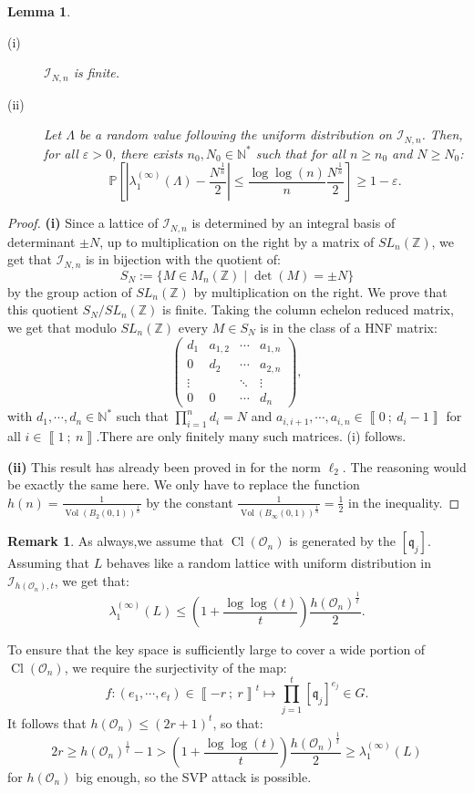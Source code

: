 \documentclass[a4paper,10pt]{report}
\theoremstyle{definition}
\theoremstyle{plain}
\newtheorem{Lemma}[Definition]{Lemma}
\theoremstyle{definition}
\newtheorem{Remark}[Definition]{Remark}
\newcommand{\N}{\mathbb{N}}
\newcommand{\Z}{\mathbb{Z}}
\newcommand{\m}[1]{\mathcal{#1}}
\newcommand{\mO}{\mathcal{O}}
\renewcommand{\i}[2]{\left\llbracket #1~;~#2\right\rrbracket}
\renewcommand{\(}{\left(}
\renewcommand{\)}{\right)}
\renewcommand{\P}{\mathbb{P}}
\newcommand{\mf}[1]{\mathfrak{#1}}
\DeclareMathOperator{\Cl}{Cl}
\DeclareMathOperator{\Vol}{Vol}
\begin{document}
\begin{Lemma}\label{Lemma 22}
\begin{description}
\item[(i)] $\m{I}_{N,n}$ is finite.
\item[(ii)] Let $\Lambda$ be a random value following the uniform distribution on $\m{I}_{N,n}$. Then, for all $\varepsilon>0$, there exists $n_0, N_0\in\N^*$ such that for all $n\geq n_0$ and $N\geq N_0$:
\[\P\left[\left|\lambda_1^{(\infty)}(\Lambda)-\frac{N^{\frac{1}{n}}}{2}\right|\leq \frac{\log\log(n)}{n}\frac{N^{\frac{1}{n}}}{2}\right]\geq 1-\varepsilon.\]
\end{description}
\end{Lemma}

\begin{proof}
\textbf{(i)} Since a lattice of $\m{I}_{N,n}$ is determined by an integral basis of determinant $\pm N$, up to multiplication on the right by a matrix of $SL_n(\Z)$, we get that $\m{I}_{N,n}$ is in bijection with the quotient of:
\[S_N:=\{M\in M_n(\Z)\mid \det(M)=\pm N\}\]
by the group action of $SL_n(\Z)$ by multiplication on the right.  We prove that this quotient $S_N/SL_n(\Z)$ is finite. Taking the column echelon reduced matrix, we get that modulo $SL_n(\Z)$ every $M\in S_N$ is in the class of a HNF matrix:
\[\(\begin{array}{cccc}
d_1 & a_{1,2} & \cdots & a_{1,n}\\
0 & d_2 & \cdots & a_{2,n}\\
\vdots &  & \ddots & \vdots\\
0 & 0 & \cdots & d_n
\end{array}\),\]
with $d_1, \cdots, d_n\in\N^*$ such that $\prod_{i=1}^n d_i=N$ and $a_{i,i+1}, \cdots, a_{i,n}\in\i{0}{d_i-1}$ for all $i\in\i{1}{n}$.There are only finitely many such matrices. (i) follows.

\textbf{(ii)} This result has already been proved in \cite[Theorem 11]{Aono} for the norm $\ell_2$. The reasoning would be exactly the same here. We only have to replace the function $h(n)=\frac{1}{\Vol(B_2(0,1))^{\frac{1}{n}}}$ by the constant $\frac{1}{\Vol(B_\infty(0,1))^{\frac{1}{n}}}=\frac{1}{2}$ in the inequality.
\end{proof}

\begin{Remark}\label{Remark 4}
As always,we assume that $\Cl(\mO_n)$ is generated by the $[\mf{q}_j]$. Assuming that $L$ behaves like a random lattice with uniform distribution in $\m{I}_{h(\mO_n),t}$, we get that:
\[\lambda_1^{(\infty)}(L)\leq \(1+\frac{\log\log(t)}{t}\)\frac{h(\mO_n)^{\frac{1}{t}}}{2}.\] 

To ensure that the key space is sufficiently large to cover a wide portion of $\Cl(\mO_n)$, we require the surjectivity of the map:
\[f:(e_1,\cdots, e_t)\in\i{-r}{r}^t\longmapsto \prod_{j=1}^t[\mf{q}_j]^{e_j}\in G.\]
It follows that $h(\mO_n)\leq (2r+1)^t$, so that:
\[2r\geq h(\mO_n)^{\frac{1}{t}}-1>\(1+\frac{\log\log(t)}{t}\)\frac{h(\mO_n)^{\frac{1}{t}}}{2}\geq \lambda_1^{(\infty)}(L)\]
for $h(\mO_n)$ big enough, so the SVP attack is possible.
\end{Remark}
\end{document}
